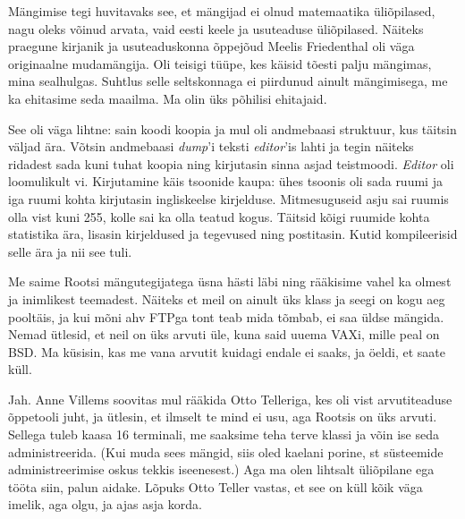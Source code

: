 Mängimise tegi huvitavaks see, et mängijad ei olnud matemaatika üliõpilased, 
nagu oleks võinud arvata, vaid eesti keele ja usuteaduse 
üliõpilased. Näiteks praegune kirjanik ja usuteaduskonna õppejõud Meelis 
Friedenthal oli väga originaalne mudamängija. 
Oli teisigi tüüpe, kes käisid tõesti palju mängimas, mina 
sealhulgas. Suhtlus selle seltskonnaga ei piirdunud ainult 
mängimisega, me ka ehitasime seda maailma. Ma olin üks põhilisi ehitajaid.


See oli väga lihtne: sain koodi koopia ja mul oli andmebaasi struktuur, kus 
täitsin väljad ära. Võtsin andmebaasi \emph{dump}'i 
teksti \emph{editor}'is lahti ja tegin näiteks ridadest sada 
kuni tuhat koopia ning kirjutasin sinna asjad teistmoodi. \emph{Editor} oli loomulikult vi. Kirjutamine käis tsoonide kaupa: ühes tsoonis oli 
sada ruumi ja iga ruumi kohta kirjutasin ingliskeelse kirjelduse. Mitmesuguseid asju sai 
ruumis olla vist kuni 255, kolle sai ka olla teatud
kogus. Täitsid kõigi ruumide kohta statistika ära, lisasin kirjeldused ja
tegevused ning postitasin. Kutid kompileerisid selle ära ja nii see tuli. 

Me saime Rootsi mängutegijatega üsna hästi läbi ning rääkisime 
vahel ka olmest ja inimlikest teemadest. Näiteks et meil on ainult üks klass ja 
seegi on kogu aeg pooltäis, ja kui mõni ahv FTPga tont teab mida tõmbab, ei 
saa üldse mängida. Nemad ütlesid, 
et neil on üks arvuti üle, kuna said uuema VAXi, mille peal on 
BSD. Ma küsisin, kas me vana arvutit kuidagi endale ei 
saaks, ja öeldi, et saate küll. 

 \label{sisu!jaanus_liivi_tn}

Jah. Anne Villems soovitas mul rääkida Otto Telleriga, kes oli vist 
arvutiteaduse õppetooli juht, ja ütlesin, et ilmselt te mind ei usu, aga Rootsis on üks arvuti. Sellega tuleb kaasa 16 terminali, 
me saaksime teha terve klassi ja võin ise seda 
administreerida. (Kui muda sees mängid, siis oled kaelani porine, st 
süsteemide administreerimise oskus tekkis iseenesest.) 
Aga ma olen lihtsalt üliõpilane ega tööta siin, palun aidake. Lõpuks Otto Teller vastas, et see on küll kõik
väga imelik, aga olgu, ja ajas asja korda.

